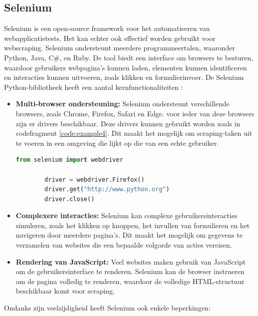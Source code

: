 \subsection{Selenium}
Selenium is een open-source framework voor het automatiseren van webapplicatietests. Het kan echter ook effectief worden gebruikt voor webscraping. Selenium ondersteunt meerdere programmeertalen, waaronder Python, Java, C#, en Ruby. De tool biedt een interface om browsers te besturen, waardoor gebruikers webpagina's kunnen laden, elementen kunnen identificeren en interacties kunnen uitvoeren, zoals klikken en formulierinvoer. De Selenium Python-bibliotheek heeft een aantal kernfunctionaliteiten \autocite{Muthukadan2011}:

\begin{itemize}
    \item \textbf{Multi-browser ondersteuning:} Selenium ondersteunt verschillende browsers, zoals Chrome, Firefox, Safari en Edge. voor ieder van deze browsers zijn er drivers beschikbaar. Deze drivers kunnen gebruikt worden zoals in codefragment \ref{code:example4}. Dit maakt het mogelijk om scraping-taken uit te voeren in een omgeving die lijkt op die van een echte gebruiker.

    \begin{lstlisting}[language=Python, caption={voorbeeld Selenium driver}, captionpos=b, label=code:example4]
        from selenium import webdriver

        driver = webdriver.Firefox()
        driver.get("http://www.python.org")
        driver.close()
    \end{lstlisting}

    \item \textbf{Complexere interacties:} Selenium kan complexe gebruikersinteracties simuleren, zoals het klikken op knoppen, het invullen van formulieren en het navigeren door meerdere pagina's. Dit maakt het mogelijk om gegevens te verzamelen van websites die een bepaalde volgorde van acties vereisen.

    \item \textbf{Rendering van JavaScript:} Veel websites maken gebruik van JavaScript om de gebruikersinterface te renderen. Selenium kan de browser instrueren om de pagina volledig te renderen, waardoor de volledige HTML-structuur beschikbaar komt voor scraping.

\end{itemize}

Ondanks zijn veelzijdigheid heeft Selenium ook enkele beperkingen:

